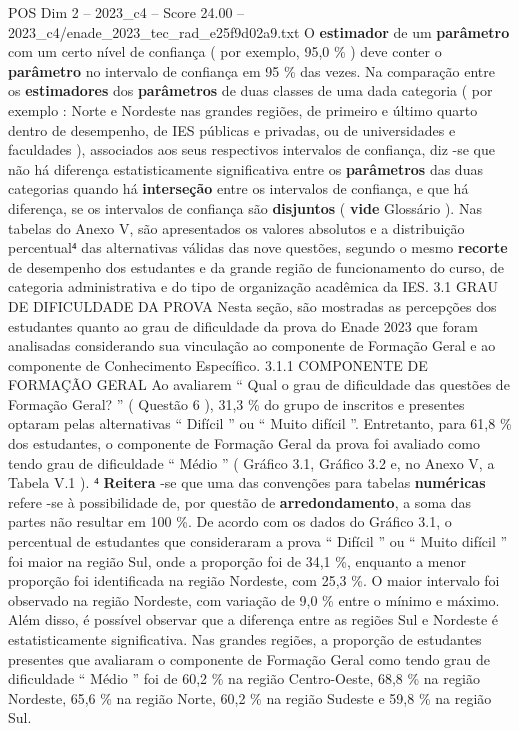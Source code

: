 \begin{textsample}{POS Dim 2 – 2023\_c4 – Score 24.00 – 2023\_c4/enade\_2023\_tec\_rad\_e25f9d02a9.txt}
O \textbf{estimador} de um \textbf{parâmetro} com um certo nível de confiança ( por exemplo, 95,0 \% ) deve conter o \textbf{parâmetro} no intervalo de confiança em 95 \% das vezes.
Na comparação entre os \textbf{estimadores} dos \textbf{parâmetros} de duas classes de uma dada categoria ( por exemplo : Norte e Nordeste nas grandes regiões, de primeiro e último quarto dentro de desempenho, de IES públicas e privadas, ou de universidades e faculdades ), associados aos seus respectivos intervalos de confiança, diz -se que não há diferença estatisticamente significativa entre os \textbf{parâmetros} das duas categorias quando há \textbf{interseção} entre os intervalos de confiança, e que há diferença, se os intervalos de confiança são \textbf{disjuntos} ( \textbf{vide} Glossário ).
Nas tabelas do Anexo V, são apresentados os valores absolutos e a distribuição percentual⁴ das alternativas válidas das nove questões, segundo o mesmo \textbf{recorte} de desempenho dos estudantes e da grande região de funcionamento do curso, de categoria administrativa e do tipo de organização acadêmica da IES. 3.1 GRAU DE DIFICULDADE DA PROVA Nesta seção, são mostradas as percepções dos estudantes quanto ao grau de dificuldade da prova do Enade 2023 que foram analisadas considerando sua vinculação ao componente de Formação Geral e ao componente de Conhecimento Específico. 3.1.1 COMPONENTE DE FORMAÇÃO GERAL Ao avaliarem “ Qual o grau de dificuldade das questões de Formação Geral? ” ( Questão 6 ), 31,3 \% do grupo de inscritos e presentes optaram pelas alternativas “ Difícil ” ou “ Muito difícil ”.
Entretanto, para 61,8 \% dos estudantes, o componente de Formação Geral da prova foi avaliado como tendo grau de dificuldade “ Médio ” ( Gráfico 3.1, Gráfico 3.2 e, no Anexo V, a Tabela V.1 ). ⁴ \textbf{Reitera} -se que uma das convenções para tabelas \textbf{numéricas} refere -se à possibilidade de, por questão de \textbf{arredondamento}, a soma das partes não resultar em 100 \%.
De acordo com os dados do Gráfico 3.1, o percentual de estudantes que consideraram a prova “ Difícil ” ou “ Muito difícil ” foi maior na região Sul, onde a proporção foi de 34,1 \%, enquanto a menor proporção foi identificada na região Nordeste, com 25,3 \%.
O maior intervalo foi observado na região Nordeste, com variação de 9,0 \% entre o mínimo e máximo.
Além disso, é possível observar que a diferença entre as regiões Sul e Nordeste é estatisticamente significativa.
Nas grandes regiões, a proporção de estudantes presentes que avaliaram o componente de Formação Geral como tendo grau de dificuldade “ Médio ” foi de 60,2 \% na região Centro-Oeste, 68,8 \% na região Nordeste, 65,6 \% na região Norte, 60,2 \% na região Sudeste e 59,8 \% na região Sul.

\end{textsample}
